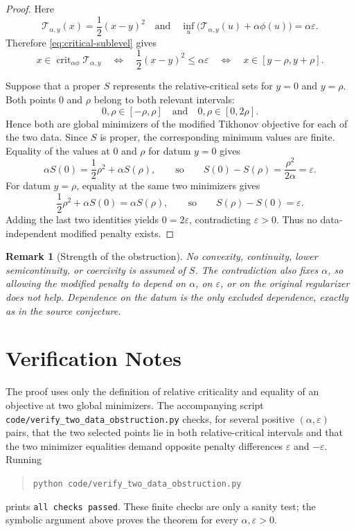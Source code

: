 \documentclass[11pt]{article}
\newtheorem{remark}{Remark}
\newcommand{\crit}{\operatorname{crit}}
\begin{document}
\begin{proof}
Here
\[
 \mathcal T_{\alpha,y}(x)=\frac12(x-y)^2
 \quad\text{and}\quad
 \inf_u\bigl(\mathcal T_{\alpha,y}(u)+\alpha\phi(u)\bigr)
 =\alpha\varepsilon.
\]
Therefore \eqref{eq:critical-sublevel} gives
\[
 x\in\crit_{\alpha\phi}\mathcal T_{\alpha,y}
 \quad\Longleftrightarrow\quad
 \frac12(x-y)^2\leq\alpha\varepsilon
 \quad\Longleftrightarrow\quad
 x\in[y-\rho,y+\rho].
\]

Suppose that a proper \(S\) represents the relative-critical sets for
\(y=0\) and \(y=\rho\). Both points \(0\) and \(\rho\) belong to both relevant
intervals:
\[
 0,\rho\in[-\rho,\rho]
 \quad\text{and}\quad
 0,\rho\in[0,2\rho].
\]
Hence both are global minimizers of the modified Tikhonov objective for each
of the two data. Since \(S\) is proper, the corresponding minimum values are
finite. Equality of the values at \(0\) and \(\rho\) for datum \(y=0\) gives
\[
 \alpha S(0)=\frac12\rho^2+\alpha S(\rho),
 \qquad\text{so}\qquad
 S(0)-S(\rho)=\frac{\rho^2}{2\alpha}=\varepsilon.
\]
For datum \(y=\rho\), equality at the same two minimizers gives
\[
 \frac12\rho^2+\alpha S(0)=\alpha S(\rho),
 \qquad\text{so}\qquad
 S(\rho)-S(0)=\varepsilon.
\]
Adding the last two identities yields \(0=2\varepsilon\), contradicting
\(\varepsilon>0\). Thus no data-independent modified penalty exists.
\end{proof}

\begin{remark}[Strength of the obstruction]
No convexity, continuity, lower semicontinuity, or coercivity is assumed of
\(S\). The contradiction also fixes \(\alpha\), so allowing the modified
penalty to depend on \(\alpha\), on \(\varepsilon\), or on the original
regularizer does not help. Dependence on the datum is the only excluded
dependence, exactly as in the source conjecture.
\end{remark}

\section*{Verification Notes}

The proof uses only the definition of relative criticality and equality of an
objective at two global minimizers. The accompanying script
\texttt{code/verify\_two\_data\_obstruction.py} checks, for several positive
\((\alpha,\varepsilon)\) pairs, that the two selected points lie in both
relative-critical intervals and that the two minimizer equalities demand
opposite penalty differences \(\varepsilon\) and \(-\varepsilon\). Running
\begin{quote}
\texttt{python code/verify\_two\_data\_obstruction.py}
\end{quote}
prints \texttt{all checks passed}. These finite checks are only a sanity test;
the symbolic argument above proves the theorem for every
\(\alpha,\varepsilon>0\).
\end{document}
